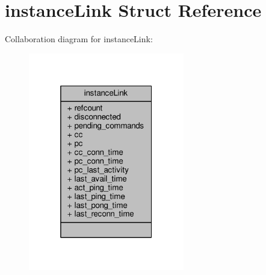 \hypertarget{structinstanceLink}{}\section{instance\+Link Struct Reference}
\label{structinstanceLink}


Collaboration diagram for instance\+Link\+:\nopagebreak
\begin{figure}[H]
\begin{center}
\leavevmode
\includegraphics[width=193pt]{structinstanceLink__coll__graph}
\end{center}
\end{figure}
